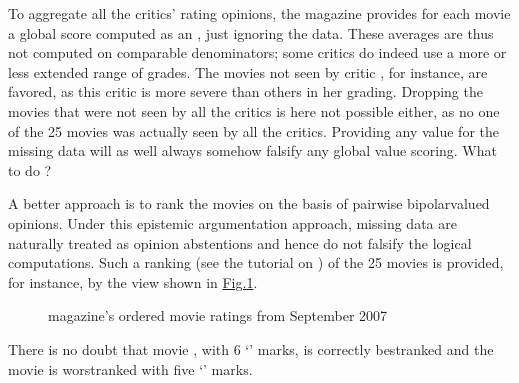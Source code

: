 \documentclass[a4paper,12pt,english]{sphinxhowto}
\let\sphinxpxdimen\pdfpxdimen\else\newdimen\sphinxpxdimen
\begin{document}
\sphinxAtStartPar
To aggregate all the critics’ rating opinions, the  magazine provides for each movie a global score computed as an , just ignoring the  data. These averages are thus not computed on comparable denominators; some critics do indeed use a more or less extended range of grades. The movies not seen by critic , for instance, are favored, as this critic is more severe than others in her grading. Dropping the movies that were not seen by all the critics is here not possible either, as no one of the 25 movies was actually seen by all the critics. Providing any value for the missing data will as well always somehow falsify any global value scoring. What to do ?

\sphinxAtStartPar
A better approach is to rank the movies on the basis of pairwise bipolar\sphinxhyphen{}valued   opinions. Under this epistemic argumentation approach, missing data are naturally treated as opinion abstentions and hence do not falsify the logical computations. Such a ranking (see the tutorial on ) of the 25 movies is provided, for instance, by the  view shown in \hyperref[\detokenize{pearls:graffiti07-2}]{Fig.\@ \ref{\detokenize{pearls:graffiti07-2}}}.

\begin{sphinxVerbatim}[commandchars=\\\{\}]
                             
                             
\end{sphinxVerbatim}

\begin{figure}[H]
\centering
\capstart

\noindent\sphinxincludegraphics[width=600\sphinxpxdimen]{{graffiti07_2}.png}
\caption{ magazine’s ordered movie ratings from September 2007}\label{\detokenize{pearls:graffiti07-2}}\end{figure}

\sphinxAtStartPar
There is no doubt that movie , with 6 ‘’ marks, is correctly best\sphinxhyphen{}ranked and the movie  is worst\sphinxhyphen{}ranked with five ‘’ marks.
\end{document}
